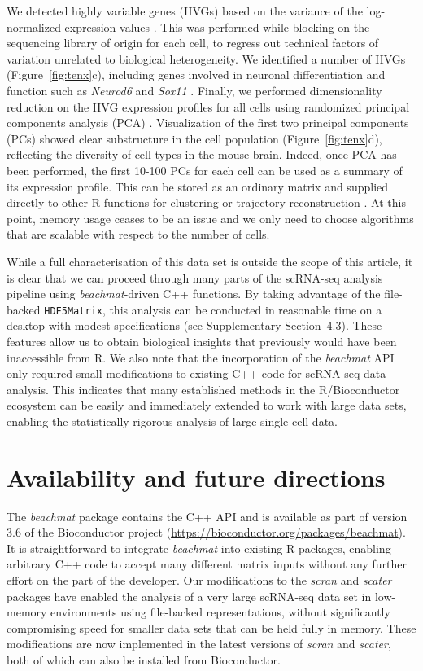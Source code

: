 \documentclass[10pt,letterpaper]{article}
\newcommand{\suppsecrealsystem}{4.3}
\newcommand{\beachmat}{\textit{beachmat}}
\newcommand{\code}[1]{\texttt{#1}}
\begin{document}
We detected highly variable genes (HVGs) based on the variance of the log-normalized expression values \cite{lun2016stepbystep}.
This was performed while blocking on the sequencing library of origin for each cell, to regress out technical factors of variation unrelated to biological heterogeneity.
We identified a number of HVGs (Figure~\ref{fig:tenx}c), including genes involved in neuronal differentiation and function such as \textit{Neurod6} \cite{ kay2011neurod6} and \textit{Sox11} \cite{bergsland2006establishment}. 
Finally, we performed dimensionality reduction on the HVG expression profiles for all cells using randomized principal components analysis (PCA) \cite{halko2011finding}.
Visualization of the first two principal components (PCs) showed clear substructure in the cell population (Figure~\ref{fig:tenx}d), reflecting the diversity of cell types in the mouse brain.
Indeed, once PCA has been performed, the first 10-100 PCs for each cell can be used as a summary of its expression profile.
This can be stored as an ordinary matrix and supplied directly to other R functions for clustering \cite{xu2015identification,csardi2006igraph} or trajectory reconstruction \cite{trapnell2014dynamics}.
At this point, memory usage ceases to be an issue and we only need to choose algorithms that are scalable with respect to the number of cells.

While a full characterisation of this data set is outside the scope of this article, it is clear that we can proceed through many parts of the scRNA-seq analysis pipeline using \beachmat{}-driven C++ functions.
By taking advantage of the file-backed \code{HDF5Matrix}, this analysis can be conducted in reasonable time on a desktop with modest specifications (see Supplementary Section~\suppsecrealsystem{}).
These features allow us to obtain biological insights that previously would have been inaccessible from R.
We also note that the incorporation of the \beachmat{} API only required small modifications to existing C++ code for scRNA-seq data analysis.
This indicates that many established methods in the R/Bioconductor ecosystem can be easily and immediately extended to work with large data sets,
enabling the statistically rigorous analysis of large single-cell data.

\section*{Availability and future directions}
The \beachmat{} package contains the C++ API and is available as part of version 3.6 of the Bioconductor project (\url{https://bioconductor.org/packages/beachmat}).
It is straightforward to integrate \beachmat{} into existing R packages, enabling arbitrary C++ code to accept many different matrix inputs without any further effort on the part of the developer.
Our modifications to the \textit{scran} and \textit{scater} packages have enabled the analysis of a very large scRNA-seq data set in low-memory environments using file-backed representations, without significantly compromising speed for smaller data sets that can be held fully in memory.
These modifications are now implemented in the latest versions of \textit{scran} and \textit{scater}, both of which can also be installed from Bioconductor.
\end{document}
